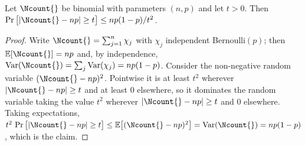 
\begin{lemma}\label{lem:cheb}
Let $\Ncount{}$ be binomial with parameters $(n,p)$ and let $t>0$. Then
$\Pr\big[|\Ncount{}-np|\ge t\big]\le np(1-p)/t^{2}$.
\end{lemma}

\begin{proof}
Write $\Ncount{}=\sum_{j=1}^{n}\chi_j$ with $\chi_j$ independent
Bernoulli$(p)$; then $\mathbb{E}[\Ncount{}]=np$ and, by independence,
$\operatorname{Var}(\Ncount{})=\sum_{j}\operatorname{Var}(\chi_j)=np(1-p)$.
Consider the non-negative random variable $(\Ncount{}-np)^{2}$. Pointwise it is
at least $t^{2}$ wherever $|\Ncount{}-np|\ge t$ and at least $0$ elsewhere, so
it dominates the random variable taking the value $t^{2}$ wherever
$|\Ncount{}-np|\ge t$ and $0$ elsewhere. Taking expectations,
$t^{2}\,\Pr\big[|\Ncount{}-np|\ge t\big]
\le\mathbb{E}\big[(\Ncount{}-np)^{2}\big]
=\operatorname{Var}(\Ncount{})=np(1-p)$, which is the claim.
\end{proof}
